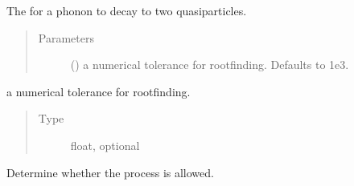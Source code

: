 \documentclass[letterpaper,10pt,english]{sphinxmanual}
\begin{document}

\begin{fulllineitems}
\label{\detokenize{code_structure:scdc.interaction.PhononDecayToQuasiparticles}}
The  for a phonon to decay to two quasiparticles.
\begin{quote}\begin{description}
\item[{Parameters}] \leavevmode
{} (\sphinxstyleliteralemphasis{\sphinxupquote{, }}) \textendash{} a numerical tolerance for root\sphinxhyphen{}finding.
Defaults to 1e\sphinxhyphen{}3.

\end{description}\end{quote}

\begin{fulllineitems}
\label{\detokenize{code_structure:scdc.interaction.PhononDecayToQuasiparticles.tolerance}}
a numerical tolerance for root\sphinxhyphen{}finding.
\begin{quote}\begin{description}
\item[{Type}] \leavevmode
float, optional

\end{description}\end{quote}

\end{fulllineitems}


\begin{fulllineitems}
\label{\detokenize{code_structure:scdc.interaction.PhononDecayToQuasiparticles.allowed}}
Determine whether the process is allowed.


\end{fulllineitems}
\end{fulllineitems}
\end{document}
